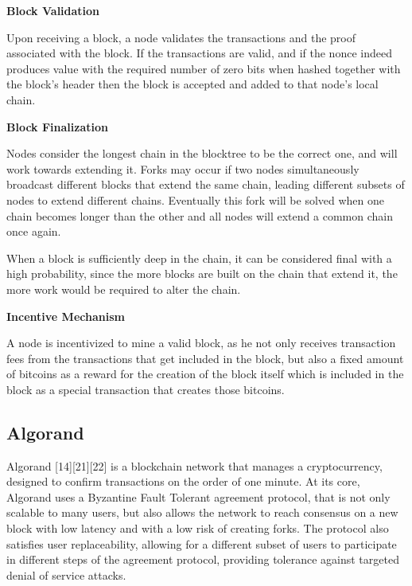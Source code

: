 \vspace{0.25cm}

\textbf{Block Validation}

Upon receiving a block, a node validates the transactions and the proof associated with the block. If the transactions are valid, and if the nonce indeed produces value with the required number of zero bits when hashed together with the block’s header then the block is accepted and added to that node’s local chain.

\vspace{0.25cm}

\textbf{Block Finalization}

Nodes consider the longest chain in the blocktree to be the correct one, and will work towards extending it. Forks may occur if two nodes simultaneously broadcast different blocks that extend the same chain, leading different subsets of nodes to extend different chains. Eventually this fork will be solved when one chain becomes longer than the other and all nodes will extend a common chain once again.

When a block is sufficiently deep in the chain, it can be considered final with a high probability, since the more blocks are built on the chain that extend it, the more work would be required to alter the chain.


\vspace{0.25cm}

\textbf{Incentive Mechanism}

A node is incentivized to mine a valid block, as he not only receives transaction fees from the transactions that get included in the block, but also a fixed amount of bitcoins as a reward for the creation of the block itself which is included in the block as a special transaction that creates those bitcoins.




\subsection{Algorand}

Algorand [14][21][22] is a blockchain network that manages a cryptocurrency, designed to confirm transactions on the order of one minute. At its core, Algorand uses a Byzantine Fault Tolerant agreement protocol, that is not only scalable to many users, but also allows the network to reach consensus on a new block with low latency and with a low risk of creating forks. The protocol also satisfies user replaceability, allowing for a different subset of users to participate in different steps of the agreement protocol, providing tolerance against targeted denial of service attacks.

